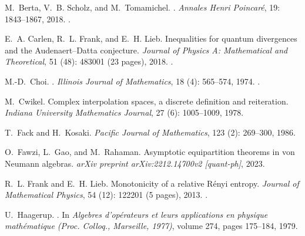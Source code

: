 \documentclass[12pt]{article}
\theoremstyle{definition}
\theoremstyle{remark}
\numberwithin{equation}{section}
\begin{document}
\begin{thebibliography}{27}
M.~Berta, V.~B. Scholz, and M.~Tomamichel.
.
\newblock \emph{Annales Henri Poincar{\'e}}, 19: 1843--1867, 2018.
\newblock {}.


E.~A. Carlen, R.~L. Frank, and E.~H. Lieb.
\newblock Inequalities for quantum divergences and the {Audenaert--Datta}
  conjecture.
\newblock \emph{Journal of Physics A: Mathematical and Theoretical},
  51 (48): 483001 (23 pages), 2018.
\newblock {}.

M.-D.~Choi.
.
\newblock \emph{Illinois Journal of Mathematics}, 18 (4):
  565--574, 1974.
\newblock {}.

M.~Cwikel.
\newblock Complex interpolation spaces, a discrete definition and reiteration.
\newblock \emph{Indiana University Mathematics Journal}, 27 (6):
  1005--1009, 1978.

T.~Fack and H.~Kosaki.
\newblock \emph{Pacific Journal of Mathematics}, 123 (2):
269--300, 1986.
  
O.~Fawzi, L.~Gao, and M.~Rahaman.
\newblock Asymptotic equipartition theorems in von Neumann algebras.
\newblock \emph{arXiv preprint arXiv:2212.14700v2 [quant-ph]}, 2023.

R.~L. Frank and E.~H. Lieb.
\newblock Monotonicity of a relative {R}{\'e}nyi entropy.
\newblock \emph{Journal of Mathematical Physics}, 54 (12):
122201 (5 pages), 2013.
\newblock {}.

U.~Haagerup.
.
\newblock In \emph{Algebres d'op{\'e}rateurs et leurs applications en
  physique math{\'e}matique (Proc. Colloq., Marseille, 1977)}, volume 274,
  pages 175--184, 1979.
  

\end{thebibliography}
\end{document}
